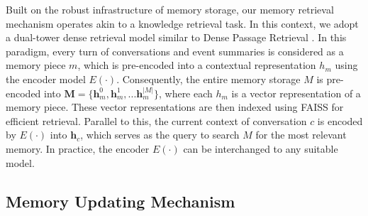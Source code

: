 Built on the robust infrastructure of memory storage, our memory retrieval mechanism operates akin to a knowledge retrieval task. In this context, we adopt a dual-tower dense retrieval model similar to Dense Passage Retrieval \citep{karpukhin2020dense}. 
In this paradigm, every turn of conversations and event summaries is considered as a memory piece $m$, which is pre-encoded into a contextual representation $h_{m}$ using the encoder model $E(\cdot)$. Consequently, the entire memory storage $M$ is pre-encoded into $\bm{M}=\{\bm{h}^0_{m},\bm{h}^1_{m},...\bm{h}^{|M|}_{m}\}$, where each $h_m$ is a vector representation of a memory piece. These vector representations are then indexed using FAISS \citep{johnson2019billion} for efficient retrieval.
Parallel to this, the current context of conversation $c$ is encoded by $E(\cdot)$ into $\bm{h}_{c}$, which serves as the query to search $M$ for the most relevant memory. In practice, the encoder $E(\cdot)$ can be interchanged to any suitable model.



\subsection{Memory Updating Mechanism}
\label{sec:memory-updater}

